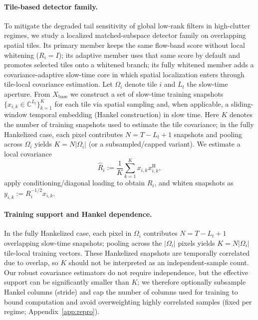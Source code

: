 \documentclass[11pt]{article}
\newcommand{\wh}{\widehat}
\newcommand{\Hh}{^{\mathrm{H}}}
\newif\ifSTAPPAPERONLY
\newcommand{\SuppOrApp}[1]{\ifSTAPPAPERONLY Supplementary Material\else Appendix~\ref{#1}\fi}
\begin{document}
\paragraph{Tile-based detector family.}
To mitigate the degraded tail sensitivity of global low-rank filters in high-clutter regimes, we study a localized matched-subspace detector family on overlapping spatial tiles. Its primary member keeps the same flow-band score without local whitening ($R_i=I$); its adaptive member uses that same score by default and promotes selected tiles onto a whitened branch; its fully whitened member adds a covariance-adaptive slow-time core in which spatial localization enters through tile-local covariance estimation. Let $\Omega_i$ denote tile $i$ and $L_t$ the slow-time aperture. From $X_{\mathrm{base}}$ we construct a set of slow-time training snapshots $\{x_{i,k}\in\mathbb{C}^{L_t}\}_{k=1}^K$ for each tile via spatial sampling and, when applicable, a sliding-window temporal embedding (Hankel construction) in slow time. Here $K$ denotes the number of training snapshots used to estimate the tile covariance; in the fully Hankelized case, each pixel contributes $N=T-L_t+1$ snapshots and pooling across $\Omega_i$ yields $K=N|\Omega_i|$ (or a subsampled/capped variant). We estimate a local covariance
\[
  \wh R_i := \frac{1}{K}\sum_{k=1}^K x_{i,k}x_{i,k}\Hh,
\]
apply conditioning/diagonal loading to obtain $R_i$, and whiten snapshots as $y_{i,k}:=R_i^{-1/2}x_{i,k}$.
\paragraph{Training support and Hankel dependence.}
In the fully Hankelized case, each pixel in $\Omega_i$ contributes $N=T-L_t+1$ overlapping slow-time snapshots; pooling across the $|\Omega_i|$ pixels yields $K=N|\Omega_i|$ tile-local training vectors. These Hankelized snapshots are temporally correlated due to overlap, so $K$ should not be interpreted as an independent-sample count. Our robust covariance estimators do not require independence, but the effective support can be significantly smaller than $K$; we therefore optionally subsample Hankel columns (stride) and cap the number of columns used for training to bound computation and avoid overweighting highly correlated samples (fixed per regime; \SuppOrApp{app:repro}).
\end{document}
